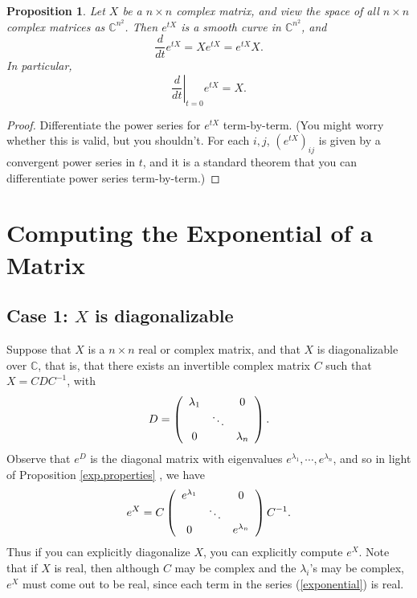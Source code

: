 \documentclass{amsbook}
\theoremstyle{plain}
\newtheorem{proposition}[theorem]{Proposition}
\numberwithin{equation}{chapter}
\numberwithin{theorem}{chapter}
\begin{document}
\begin{proposition}
\label{derivative}Let $X$ be a $n\times n$ complex matrix, and view the space
of all $n\times n$ complex matrices as $\mathbb{C}^{n^{2}}$. Then $e^{tX}$ is
a smooth curve in $\mathbb{C}^{n^{2}}$, and
\[
\frac{d}{dt}e^{tX}=Xe^{tX}=e^{tX}X\text{.}%
\]
In particular,
\[
\left.  \frac{d}{dt}\right|  _{t=0}e^{tX}=X\text{.}%
\]
\end{proposition}

\begin{proof}
Differentiate the power series for $e^{tX}$ term-by-term. (You might worry
whether this is valid, but you shouldn't. For each $i,j$, $\left(
e^{tX}\right)  _{ij}$ is given by a convergent power series in $t$, and it is
a standard theorem that you can differentiate power series term-by-term.)
\end{proof}

\section{Computing the Exponential of a Matrix\label{computing}}

\subsection{Case 1: $X$ is diagonalizable}

Suppose that $X$ is a $n\times n$ real or complex matrix, and that $X$ is
diagonalizable over $\mathbb{C}$, that is, that there exists an invertible
complex matrix $C$ such that $X=CDC^{-1}$, with
\[
D=\left(
\begin{array}
[c]{ccc}%
\lambda_{1} &  & 0\\
& \ddots & \\
0 &  & \lambda_{n}%
\end{array}
\right)  \text{.}%
\]
Observe that $e^{D}$ is the diagonal matrix with eigenvalues $e^{\lambda_{1}%
},\cdots,e^{\lambda_{n}}$, and so in light of Proposition \ref{exp.properties}%
, we have
\[
e^{X}=C\left(
\begin{array}
[c]{ccc}%
e^{\lambda_{1}} &  & 0\\
& \ddots & \\
0 &  & e^{\lambda_{n}}%
\end{array}
\right)  C^{-1}\text{.}%
\]
Thus if you can explicitly diagonalize $X$, you can explicitly compute $e^{X}%
$. Note that if $X$ is real, then although $C$ may be complex and the
$\lambda_{i}$'s may be complex, $e^{X}$ must come out to be real, since each
term in the series (\ref{exponential}) is real.
\end{document}
